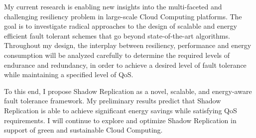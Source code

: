 
My current research is enabling new insights into the multi-faceted and challenging resiliency problem in large-scale Cloud Computing platforms. The goal is to investigate radical approaches to the design of
scalable and energy efficient fault tolerant schemes that go beyond state-of-the-art algorithms. Throughout my design, the interplay between resiliency, performance and energy consumption will be analyzed carefully to determine the required levels of
endurance and redundancy, in order to achieve a desired level of fault tolerance while maintaining a specified level of QoS.


To this end, I propose Shadow Replication as a novel, scalable, and energy-aware fault tolerance framework.
My preliminary results predict that Shadow Replication is able to achieve significant energy savings while satisfying QoS requirements. I will continue to explore and optimize Shadow Replication in support of green and sustainable Cloud Computing.